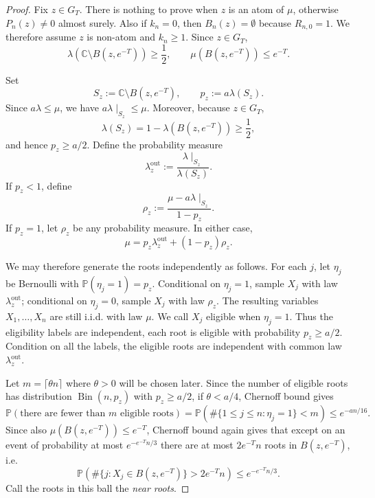 \documentclass[10pt,reqno]{amsart}
\theoremstyle{remark}
\newcommand{\C}{\mathbb C}
\newcommand{\Prob}{\mathbb P}
\begin{document}
\begin{proof}
    Fix $z\in G_T$. There is nothing to prove when $z$ is an atom of $\mu$, otherwise $P_n(z)\neq 0$ almost surely. Also if $k_n=0$, then $B_n(z)=\emptyset$ because $R_{n,0}=1$. We therefore assume $z$ is non-atom and $k_n\ge 1$. Since $z\in G_T$,
    \[\lambda(\C\setminus B(z,e^{-T}))\ge\frac{1}{2},
    \qquad \mu(B(z,e^{-T}))\le e^{-T}.\]

    Set 
    \[S_z:=\C\setminus B(z,e^{-T}),\qquad p_z:=a\lambda(S_z).\]
    Since $a\lambda\le \mu$, we have $a\lambda\mid_{S_z}\le \mu$. Moreover, because $z\in G_T$, 
    \[\lambda(S_z)=1-\lambda(B(z,e^{-T}))\ge \frac{1}{2},\]
    and hence $p_z\ge a/2$. Define the probability measure 
    \[\lambda_z^{\mathrm{out}}:=\frac{\lambda\mid_{S_z}}{\lambda(S_z)}.\]
    If $p_z<1$, define 
    \[\rho_z:=\frac{\mu-a\lambda\mid_{S_z}}{1-p_z}.\]
    If $p_z=1$, let $\rho_z$ be any probability measure. In either case,
    \[\mu=p_z\lambda_z^{\mathrm{out}}+(1-p_z)\rho_z.\]

    We may therefore generate the roots independently as follows. For each $j$, let $\eta_j$ be Bernoulli with $\Prob(\eta_j=1)=p_z$. Conditional on $\eta_j=1$, sample $X_j$ with law $\lambda_z^{\mathrm{out}}$; conditional on $\eta_j=0$, sample $X_j$ with law $\rho_z$. The resulting variables $X_1,\ldots, X_n$ are still i.i.d. with law $\mu$. We call $X_j$ eligible when $\eta_j=1$. Thus the eligibility labels are independent, each root is eligible with probability $p_z\ge a/2$. Condition on all the labels, the eligible roots are independent with common law $\lambda_z^{\mathrm{out}}$.
    
    Let $m=\lceil \theta n\rceil$ where $\theta>0$ will be chosen later. Since the number of eligible roots has distribution $\operatorname{Bin}(n,p_z)$ with $p_z\ge a/2$, if $\theta<a/4$, Chernoff bound gives 
    \[\Prob(\text{there are fewer than }m\text{ eligible roots})=\Prob(\#\{1\le j\le n:\eta_j=1\}<m)\le e^{-an/16}.\]
    Since also $\mu(B(z,e^{-T}))\le e^{-T}$, Chernoff bound again gives that except on an event of probability at most $e^{-e^{-T}n/3}$ there are at most $2e^{-T}n$ roots in $B(z,e^{-T})$, i.e.
    \[\Prob(\#\{j:X_j\in B(z,e^{-T})\}>2e^{-T}n)\le e^{-e^{-T}n/3}.\]
    Call the roots in this ball the \emph{near roots}.
    

\end{proof}
\end{document}
